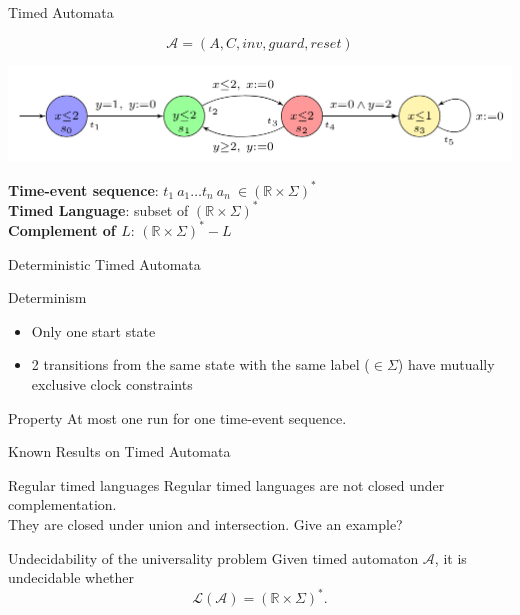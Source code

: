 \begin{frame}{Timed Automata}

  $$\mathcal{A}=(A,C,\mathit{inv},\mathit{guard},\mathit{reset})$$
  \vfill
  \begin{center}
    \includegraphics[scale=0.3]{timed.png}
  \end{center}
  \vfill
  \textbf{Time-event sequence}: $t_1~a_1\dots t_n~a_n~\in (\mathbb{R}\times\Sigma)^*$\\
  \textbf{Timed Language}: subset of $(\mathbb{R}\times\Sigma)^*$\\
  \textbf{Complement of $L$}: $(\mathbb{R}\times\Sigma)^* - L$
  
\end{frame}


\begin{frame}{Deterministic Timed Automata}

  \begin{block}{Determinism}
    \begin{itemize}
    \item Only one start state
    \item 2 transitions from the same state with the same label ($\in\Sigma$) have mutually exclusive clock constraints
    \end{itemize}
  \end{block}
  \vfill
  \begin{block}{Property}
    At most one run for one time-event sequence.
  \end{block}

\end{frame}


\begin{frame}{Known Results on Timed Automata}

  \begin{alertblock}{Regular timed languages}
    Regular timed languages are not closed under complementation.\\
    They are closed under union and intersection.
    {\color{red} Give an example?}
  \end{alertblock}
  \vfill
  \begin{alertblock}{Undecidability of the universality problem}
    Given timed automaton $\mathcal{A}$, it is undecidable whether $$\mathcal{L(A)}=(\mathbb{R}\times\Sigma)^*.$$
  \end{alertblock}
\end{frame}


